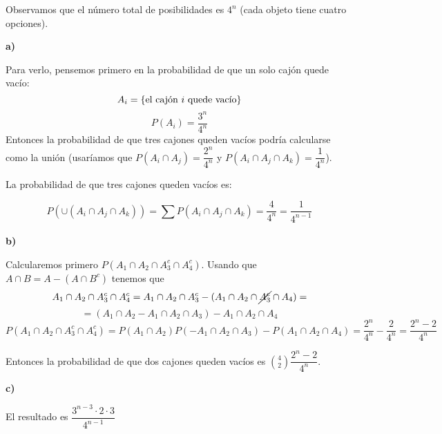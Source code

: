\documentclass[openany]{book}
\begin{document}
\begin{exercise}
    $  $\\
    Observamos que el número total de posibilidades es $ 4 ^{n} $ (cada objeto tiene cuatro opciones).

    \textbf{a)}

    Para verlo, pensemos primero en la probabilidad de que un solo cajón quede vacío:
    $$ A_i = \{\text{el cajón $ i $ quede vacío}\} $$
    $$ P(A_i) = \dfrac{3^{n}}{4^{n}} $$
    Entonces la probabilidad de que tres cajones queden vacíos podría calcularse como la unión (usaríamos que $ P(A_i \cap A_j) = \dfrac{2^{n}}{4^{n}} $ y $ P(A_i \cap A_j \cap A_{k}) = \dfrac{1}{4^{n}} $).

    La probabilidad de que tres cajones queden vacíos es:

    $$ P(\cup (A_i \cap A_j \cap A_{k})) = \sum\limits_{}^{} P(A_i \cap A_j \cap A_{k}) = \dfrac{4}{4 ^{n}} = \dfrac{1}{4^{n-1}} $$

    \textbf{b)}

    Calcularemos primero $ P(A_1 \cap A_2 \cap A_3 ^{c} \cap A_4 ^{c}) $. Usando que $ A \cap B = A - (A \cap B ^{c}) $ tenemos que
    $$ A_1 \cap A_2 \cap A_3 ^{c} \cap A_4 ^{c} = A_1 \cap A_2 \cap A_3 ^{c} - (A_1 \cap A_2 \cap\cancel{  A_3 ^{c}} \cap A_4) = $$
    $$ = (A_1 \cap A_2 - A_1 \cap A_2 \cap A_3) - A_1 \cap A_2 \cap A_4 $$
    $$ P(A_1 \cap A_2 \cap A_3 ^{c} \cap A_4 ^{c}) = P(A_1 \cap A_2) P(- A_1 \cap A_2 \cap A_3) - P(A_1 \cap A_2 \cap A_4) = \dfrac{2^{n}}{4^{n}} -\dfrac{2}{4^{n}} = \dfrac{2^{n}-2}{4^{n}}  $$

    Entonces la probabilidad de que dos cajones queden vacíos es $ \binom{4}{2} \dfrac{2^{n}-2}{4^{n}} $.

    \textbf{c)}
    
    El resultado es $ \dfrac{3^{n-3}\cdot 2\cdot 3}{4^{n-1}} $

    

\end{exercise}
\end{document}
